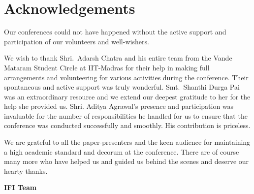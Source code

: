 
\chapter*{Acknowledgements}\label{ack}

Our conferences could not have happened without the active support and participation of our volunteers and well-wishers.

We wish to thank Shri.\ Adarsh Chatra and his entire team from the Vande Mataram Student Circle at IIT-Madras for their help in making full arrangements and volunteering for various activities during the conference. Their spontaneous and active support was truly wonderful. Smt.\ Shanthi Durga Pai was an extraordinary resource and we extend our deepest gratitude to her for the help she provided us. Shri. Aditya Agrawal’s presence and participation was invaluable for the number of responsibilities he handled for us to ensure that the conference was conducted successfully and smoothly. His contribution is priceless.

We are grateful to all the paper-presenters and the keen audience for maintaining a high academic standard and decorum at the conference. There are of course many more who have helped us and guided us behind the scenes and deserve our hearty thanks.

\begin{flushright}
 \textbf{IFI Team}
\end{flushright}

